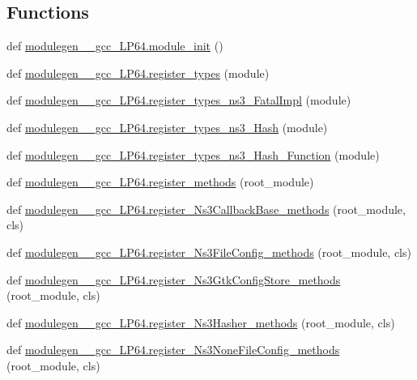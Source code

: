 \subsection*{Functions}
\begin{DoxyCompactItemize}
\item 
def \hyperlink{namespacemodulegen____gcc__LP64_a6fa3bcd89827bb55aea467ffebc10531}{modulegen\+\_\+\+\_\+gcc\+\_\+\+L\+P64.\+module\+\_\+init} ()
\item 
def \hyperlink{namespacemodulegen____gcc__LP64_ab61bb54af74e931fcb41c8f8677a8eb5}{modulegen\+\_\+\+\_\+gcc\+\_\+\+L\+P64.\+register\+\_\+types} (module)
\item 
def \hyperlink{namespacemodulegen____gcc__LP64_a2262e0d4e35e243aa3a1da10a2cb4e41}{modulegen\+\_\+\+\_\+gcc\+\_\+\+L\+P64.\+register\+\_\+types\+\_\+ns3\+\_\+\+Fatal\+Impl} (module)
\item 
def \hyperlink{namespacemodulegen____gcc__LP64_a93555c52620e0de62d76d0946d4554a2}{modulegen\+\_\+\+\_\+gcc\+\_\+\+L\+P64.\+register\+\_\+types\+\_\+ns3\+\_\+\+Hash} (module)
\item 
def \hyperlink{namespacemodulegen____gcc__LP64_a3e77b4168f4d6176242961c3f3cd12f0}{modulegen\+\_\+\+\_\+gcc\+\_\+\+L\+P64.\+register\+\_\+types\+\_\+ns3\+\_\+\+Hash\+\_\+\+Function} (module)
\item 
def \hyperlink{namespacemodulegen____gcc__LP64_a8ac8e0786047c1ed08fed9bc1a45843d}{modulegen\+\_\+\+\_\+gcc\+\_\+\+L\+P64.\+register\+\_\+methods} (root\+\_\+module)
\item 
def \hyperlink{namespacemodulegen____gcc__LP64_a911c07db6d52106940012fbb077a0853}{modulegen\+\_\+\+\_\+gcc\+\_\+\+L\+P64.\+register\+\_\+\+Ns3\+Callback\+Base\+\_\+methods} (root\+\_\+module, cls)
\item 
def \hyperlink{namespacemodulegen____gcc__LP64_adb2bdd66f6b49af114ce9a444f32ba03}{modulegen\+\_\+\+\_\+gcc\+\_\+\+L\+P64.\+register\+\_\+\+Ns3\+File\+Config\+\_\+methods} (root\+\_\+module, cls)
\item 
def \hyperlink{namespacemodulegen____gcc__LP64_a7c9979369a9172a63937332e414efa91}{modulegen\+\_\+\+\_\+gcc\+\_\+\+L\+P64.\+register\+\_\+\+Ns3\+Gtk\+Config\+Store\+\_\+methods} (root\+\_\+module, cls)
\item 
def \hyperlink{namespacemodulegen____gcc__LP64_a6615c86326777b99b9d48f2543fa24fb}{modulegen\+\_\+\+\_\+gcc\+\_\+\+L\+P64.\+register\+\_\+\+Ns3\+Hasher\+\_\+methods} (root\+\_\+module, cls)
\item 
def \hyperlink{namespacemodulegen____gcc__LP64_ac388e4948e16d9e982254c4dcbbdf7ea}{modulegen\+\_\+\+\_\+gcc\+\_\+\+L\+P64.\+register\+\_\+\+Ns3\+None\+File\+Config\+\_\+methods} (root\+\_\+module, cls)

\end{DoxyCompactItemize}
